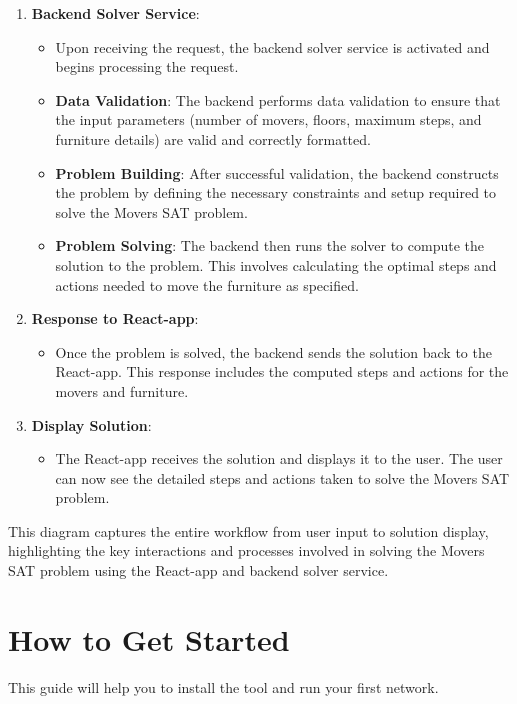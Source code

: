\documentclass[a4paper, 11pt]{article}
\begin{document}
\begin{enumerate}
   
    \item \textbf{Backend Solver Service}:
    \begin{itemize}
        \item Upon receiving the request, the backend solver service is activated and begins processing the request.
        \item \textbf{Data Validation}: The backend performs data validation to ensure that the input parameters (number of movers, floors, maximum steps, and furniture details) are valid and correctly formatted.
        \item \textbf{Problem Building}: After successful validation, the backend constructs the problem by defining the necessary constraints and setup required to solve the Movers SAT problem.
        \item \textbf{Problem Solving}: The backend then runs the solver to compute the solution to the problem. This involves calculating the optimal steps and actions needed to move the furniture as specified.
    \end{itemize}
    \item \textbf{Response to React-app}:
    \begin{itemize}
        \item Once the problem is solved, the backend sends the solution back to the React-app. This response includes the computed steps and actions for the movers and furniture.
    \end{itemize}
    \item \textbf{Display Solution}:
    \begin{itemize}
        \item The React-app receives the solution and displays it to the user. The user can now see the detailed steps and actions taken to solve the Movers SAT problem.
    \end{itemize}
\end{enumerate}

This diagram captures the entire workflow from user input to solution display, highlighting the key interactions and processes involved in solving the Movers SAT problem using the React-app and backend solver service.
\pagebreak

\section{How to Get Started}
This guide will help you to install the tool and run your first network.
\end{document}
